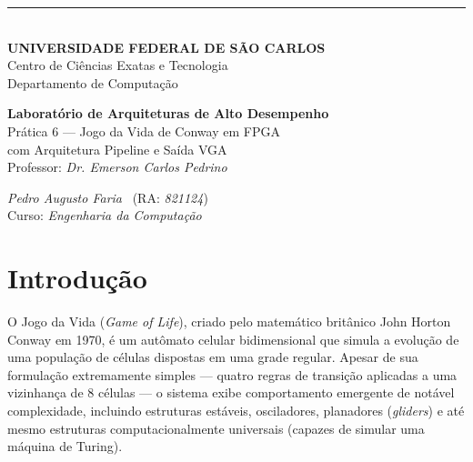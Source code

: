 \documentclass[12pt, a4paper]{article}
\begin{document}
	
	\thispagestyle{empty}
	
	\begin{titlepage}
		\centering
		
		\noindent\rule{\textwidth}{0.8pt}\\[0.2cm]
		{\large \textbf{UNIVERSIDADE FEDERAL DE SÃO CARLOS}}\\[0.15cm]
		{\normalsize Centro de Ciências Exatas e Tecnologia}\\[0.15cm]
		{\normalsize Departamento de Computação}\\[0.15cm]
		
		\vspace{0pt plus 0.35fill}
		
		{\large \textbf{Laboratório de Arquiteturas de Alto Desempenho}}\\[0.4cm]
		{\large Prática 6 --- Jogo da Vida de Conway em FPGA\\[0.2cm]
			com Arquitetura Pipeline e Saída VGA}\\[1.0cm]
		{\normalsize Professor: \textit{Dr. Emerson Carlos Pedrino}}\\
		
		\vspace{0pt plus 0.65fill}
		
		\begin{center}
			{\normalsize \textit{Pedro Augusto Faria} \ (RA: \textit{821124})}\\[0.15cm]
			{\normalsize Curso: \textit{Engenharia da Computação}}\\[0.15cm]
		\end{center}
		
	\end{titlepage}
	
	\setcounter{page}{1}
	
	\section{Introdução}
	
	O Jogo da Vida (\textit{Game of Life}), criado pelo matemático britânico John
	Horton Conway em 1970, é um autômato celular bidimensional que simula a evolução
	de uma população de células dispostas em uma grade regular. Apesar de sua
	formulação extremamente simples --- quatro regras de transição aplicadas a uma
	vizinhança de 8 células --- o sistema exibe comportamento emergente de notável
	complexidade, incluindo estruturas estáveis, osciladores, planadores
	(\textit{gliders}) e até mesmo estruturas computacionalmente universais (capazes
	de simular uma máquina de Turing).
	
\end{document}
